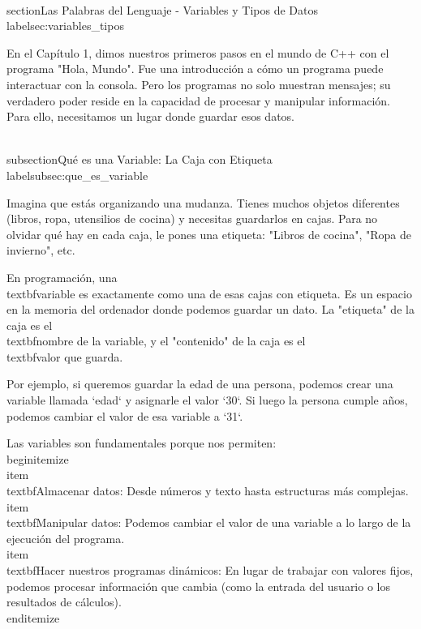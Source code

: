 \\section{Las Palabras del Lenguaje - Variables y Tipos de Datos}
\\label{sec:variables_tipos}

En el Capítulo 1, dimos nuestros primeros pasos en el mundo de C++ con el programa "Hola, Mundo". Fue una introducción a cómo un programa puede interactuar con la consola. Pero los programas no solo muestran mensajes; su verdadero poder reside en la capacidad de procesar y manipular información. Para ello, necesitamos un lugar donde guardar esos datos.

\\subsection{Qué es una Variable: La Caja con Etiqueta}
\\label{subsec:que_es_variable}

Imagina que estás organizando una mudanza. Tienes muchos objetos diferentes (libros, ropa, utensilios de cocina) y necesitas guardarlos en cajas. Para no olvidar qué hay en cada caja, le pones una etiqueta: "Libros de cocina", "Ropa de invierno", etc.

En programación, una \\textbf{variable} es exactamente como una de esas cajas con etiqueta. Es un espacio en la memoria del ordenador donde podemos guardar un dato. La "etiqueta" de la caja es el \\textbf{nombre de la variable}, y el "contenido" de la caja es el \\textbf{valor} que guarda.

Por ejemplo, si queremos guardar la edad de una persona, podemos crear una variable llamada `edad` y asignarle el valor `30`. Si luego la persona cumple años, podemos cambiar el valor de esa variable a `31`.

Las variables son fundamentales porque nos permiten:
\\begin{itemize}
    \\item \\textbf{Almacenar datos:} Desde números y texto hasta estructuras más complejas.
    \\item \\textbf{Manipular datos:} Podemos cambiar el valor de una variable a lo largo de la ejecución del programa.
    \\item \\textbf{Hacer nuestros programas dinámicos:} En lugar de trabajar con valores fijos, podemos procesar información que cambia (como la entrada del usuario o los resultados de cálculos).
\\end{itemize}

